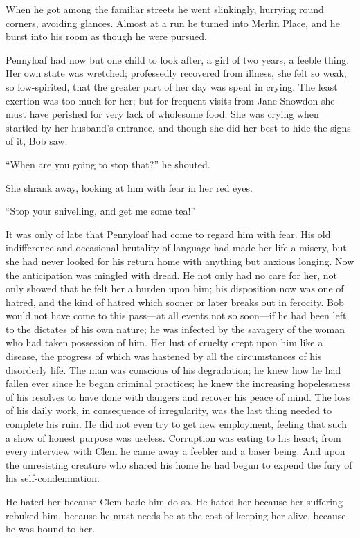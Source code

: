 When he got among the familiar streets he went slinkingly, hurrying
round corners, avoiding glances. Almost at a run he turned into Merlin
Place, and he burst into his room as though he were pursued.

Pennyloaf had now but one child to look after, a girl of two years, a
feeble thing. Her own state was wretched; professedly recovered from
illness, she felt so weak, so low-spirited, that the greater part of her
day was spent in crying. The least exertion was too much for her; but
for frequent visits from Jane Snowdon she must have perished for very
lack of wholesome food. She was crying when startled by her husband's
entrance, and though she did her best to hide the signs of it, Bob saw.

``When are you going to stop that?'' he shouted.

She shrank away, looking at him with fear in her red eyes.

{}``Stop your snivelling, and get me some tea!''

It was only of late that Pennyloaf had come to regard him with fear. His
old indifference and occasional brutality of language had made her life
a misery, but she had never looked for his return home with anything but
anxious longing. Now the anticipation was mingled with dread. He not
only had no care for her, not only showed that he felt her a burden upon
him; his disposition now was one of hatred, and the kind of hatred which
sooner or later breaks out in ferocity. Bob would not have come to this
pass---at all events not so soon---if he had been left to the dictates
of his own nature; he was infected by the savagery of the woman who had
taken possession of him. Her lust of cruelty crept upon him like a
disease, the progress of which was hastened by all the circumstances of
his disorderly life. The man was conscious of his degradation; he knew
how he had fallen ever since he began criminal practices; he knew the
increasing hopelessness of his resolves to have done with dangers and
recover his peace of mind. The loss of his daily work, in consequence of
irregularity, was the last thing needed to complete {}his ruin. He did
not even try to get new employment, feeling that such a show of honest
purpose was useless. Corruption was eating to his heart; from every
interview with Clem he came away a feebler and a baser being. And upon
the unresisting creature who shared his home he had begun to expend the
fury of his self-condemnation.

He hated her because Clem bade him do so. He hated her because her
suffering rebuked him, because he must needs be at the cost of keeping
her alive, because he was bound to her.

